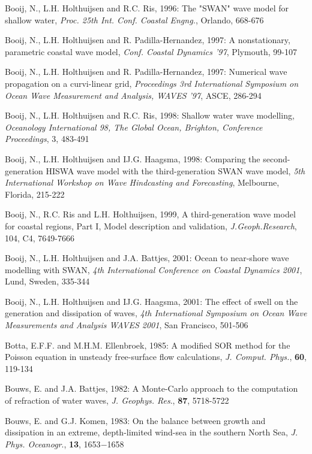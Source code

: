 \documentclass[12pt]{book}
\begin{document}
\begin{thebibliography}{10}
Booij, N., L.H. Holthuijsen and R.C. Ris, 1996: The "SWAN" wave model for shallow water, {\it Proc. 25th Int.
Conf. Coastal Engng.}, Orlando, 668-676

Booij, N., L.H. Holthuijsen and R. Padilla-Hernandez, 1997: A nonstationary, parametric coastal wave
model, {\it Conf. Coastal Dynamics '97}, Plymouth, 99-107

Booij, N., L.H. Holthuijsen and R. Padilla-Hernandez, 1997: Numerical wave propagation on a curvi-linear
grid, {\it Proceedings 3rd International Symposium on Ocean Wave Measurement and Analysis, WAVES '97}, ASCE, 286-294

Booij, N., L.H. Holthuijsen and R.C. Ris, 1998: Shallow water wave modelling, {\it Oceanology International
98, The Global Ocean, Brighton, Conference Proceedings}, 3, 483-491

Booij, N., L.H. Holthuijsen and IJ.G. Haagsma, 1998: Comparing the second-generation HISWA wave
model with the third-generation SWAN wave model, {\it 5th International Workshop on Wave
Hindcasting and Forecasting}, Melbourne, Florida, 215-222

Booij, N., R.C. Ris and L.H. Holthuijsen, 1999, A third-generation wave model for coastal regions, Part I,
Model description and validation, {\it J.Geoph.Research}, 104, C4, 7649-7666

Booij, N., L.H. Holthuijsen and J.A. Battjes, 2001: Ocean to near-shore wave modelling with SWAN,
{\it 4th International Conference on Coastal Dynamics 2001}, Lund, Sweden, 335-344

Booij, N., L.H. Holthuijsen and IJ.G. Haagsma, 2001: The effect of swell on the generation and dissipation
of waves, {\it 4th International Symposium on Ocean Wave Measurements and Analysis WAVES 2001},
San Francisco, 501-506

Botta, E.F.F. and M.H.M. Ellenbroek, 1985: A modified SOR method for the Poisson equation in unsteady free-surface
flow calculations, {\it J. Comput. Phys.}, {\bf 60}, 119-134

Bouws, E. and J.A. Battjes, 1982: A Monte-Carlo approach to the computation of refraction  of water waves,
{\it J. Geophys. Res}., {\bf 87}, 5718-5722

Bouws, E. and G.J. Komen, 1983: On the balance between growth and dissipation in an extreme, depth-limited
wind-sea in the southern North Sea, {\it J. Phys. Oceanogr}., {\bf 13}, 1653$-$1658


\end{thebibliography}
\end{document}
